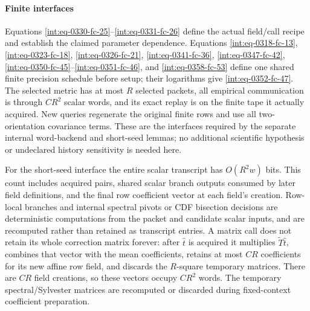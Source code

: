 \paragraph{Finite interfaces}

\mbox{}\par\smallskip


Equations \eqref{int:eq-0330-fc-25}--\allowbreak \eqref{int:eq-0331-fc-26} define the actual field/call recipe and establish the claimed parameter dependence. Equations \eqref{int:eq-0318-fc-13}, \eqref{int:eq-0323-fc-18}, \eqref{int:eq-0326-fc-21}, \eqref{int:eq-0341-fc-36}, \eqref{int:eq-0347-fc-42}, \eqref{int:eq-0350-fc-45}--\allowbreak \eqref{int:eq-0351-fc-46}, and \eqref{int:eq-0358-fc-53} define one shared finite precision schedule before setup; their logarithms give \eqref{int:eq-0352-fc-47}. The selected metric has at most \(R\) selected packets, all empirical communication is through \(CR^2\) scalar words, and its exact replay is on the finite tape it actually acquired. New queries regenerate the original finite rows and use all two-orientation covariance terms. These are the interfaces required by the separate internal word-backend and short-seed lemmas; no additional scientific hypothesis or undeclared history sensitivity is needed here.



For the short-seed interface the entire scalar transcript has \(O(R^2w)\) bits. This count includes acquired pairs, shared scalar branch outputs consumed by later field definitions, and the final row coefficient vector at each field's creation. Row-local branches and internal spectral pivots or CDF bisection decisions are deterministic computations from the packet and candidate scalar inputs, and are recomputed rather than retained as transcript entries. A matrix call does not retain its whole correction matrix forever: after \(\widehat t\) is acquired it multiplies \(\widetilde T\widehat t\), combines that vector with the mean coefficients, retains at most \(CR\) coefficients for its new affine row field, and discards the \(R\)-square temporary matrices. There are \(CR\) field creations, so these vectors occupy \(CR^2\) words. The temporary spectral/Sylvester matrices are recomputed or discarded during fixed-context coefficient preparation.



